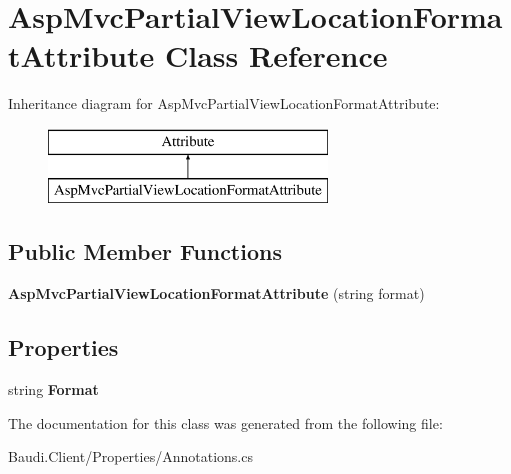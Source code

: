 \hypertarget{class_asp_mvc_partial_view_location_format_attribute}{}\section{Asp\+Mvc\+Partial\+View\+Location\+Format\+Attribute Class Reference}
\label{class_asp_mvc_partial_view_location_format_attribute}
Inheritance diagram for Asp\+Mvc\+Partial\+View\+Location\+Format\+Attribute\+:\begin{figure}[H]
\begin{center}
\leavevmode
\includegraphics[height=2.000000cm]{class_asp_mvc_partial_view_location_format_attribute}
\end{center}
\end{figure}
\subsection*{Public Member Functions}
\begin{DoxyCompactItemize}
\item 
\hypertarget{class_asp_mvc_partial_view_location_format_attribute_a890db06863b6c2b93fbdb6435b512411}{}{\bfseries Asp\+Mvc\+Partial\+View\+Location\+Format\+Attribute} (string format)\label{class_asp_mvc_partial_view_location_format_attribute_a890db06863b6c2b93fbdb6435b512411}

\end{DoxyCompactItemize}
\subsection*{Properties}
\begin{DoxyCompactItemize}
\item 
\hypertarget{class_asp_mvc_partial_view_location_format_attribute_ab75cab80e0a441e206eadb7adce25efd}{}string {\bfseries Format}\label{class_asp_mvc_partial_view_location_format_attribute_ab75cab80e0a441e206eadb7adce25efd}

\end{DoxyCompactItemize}


The documentation for this class was generated from the following file\+:\begin{DoxyCompactItemize}
\item 
Baudi.\+Client/\+Properties/Annotations.\+cs\end{DoxyCompactItemize}
